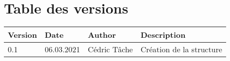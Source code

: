 \documentclass[french,11pt]{report}
\begin{document}



\section *{Table des versions}
\vspace*{0.5 cm}

\begin{table}[h]
    \begin{tabularx}{\columnwidth}{ | p{3.5em} |p{7em} | p{6.5em} | X |}
        \hline
        \textbf{Version} & \textbf{Date} & \textbf{Author} & \textbf{Description} \\
        \hline
        0.1 & 06.03.2021 & Cédric Tâche & Création de la structure \\
        \hline
    \end{tabularx}
\end{table}

\newpage


\hypersetup{
	hidelinks,
	allcolors=black,
	linktocpage,
	linktoc=all
}
\tableofcontents
\newpage




\end{document}
